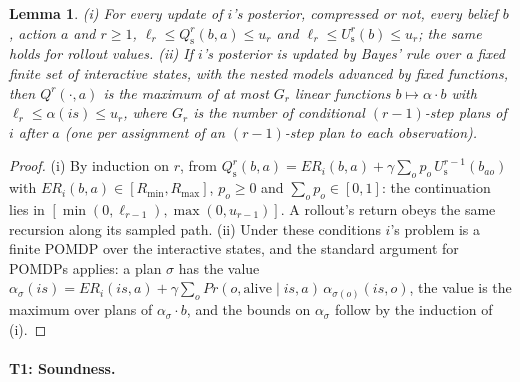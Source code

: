 \documentclass{article}
\newcommand{\ER}{\mathit{ER}}
\renewcommand{\Pr}{\mathit{Pr}}
\newtheorem{lemma}{Lemma}
\begin{document}
\begin{lemma}
\label{lem:range}
(i) For every update of $i$'s posterior, compressed or not, every belief $b$, action $a$ and $r \geq 1$, $\ell_r \leq Q^r_{\mathrm{s}}(b, a) \leq u_r$ and $\ell_r \leq U^r_{\mathrm{s}}(b) \leq u_r$; the same holds for rollout values. (ii) If $i$'s posterior is updated by Bayes' rule over a fixed finite set of interactive states, with the nested models advanced by fixed functions, then $Q^r(\cdot, a)$ is the maximum of at most $G_r$ linear functions $b \mapsto \alpha \cdot b$ with $\ell_r \leq \alpha(is) \leq u_r$, where $G_r$ is the number of conditional $(r-1)$-step plans of $i$ after $a$ (one per assignment of an $(r-1)$-step plan to each observation).
\end{lemma}
\begin{proof}
(i) By induction on $r$, from $Q^r_{\mathrm{s}}(b, a) = \ER_i(b, a) + \gamma \sum_o p_o\, U^{r-1}_{\mathrm{s}}(b_{ao})$ with $\ER_i(b, a) \in [R_{\min}, R_{\max}]$, $p_o \geq 0$ and $\sum_o p_o \in [0, 1]$: the continuation lies in $[\min(0, \ell_{r-1}), \max(0, u_{r-1})]$. A rollout's return obeys the same recursion along its sampled path. (ii) Under these conditions $i$'s problem is a finite POMDP over the interactive states, and the standard argument for POMDPs applies: a plan $\sigma$ has the value $\alpha_\sigma(is) = \ER_i(is, a) + \gamma \sum_{o} \Pr(o, \mathrm{alive} \mid is, a)\, \alpha_{\sigma(o)}(is, o)$, the value is the maximum over plans of $\alpha_\sigma \cdot b$, and the bounds on $\alpha_\sigma$ follow by the induction of (i).
\end{proof}

\paragraph{T1: Soundness.}
\end{document}
